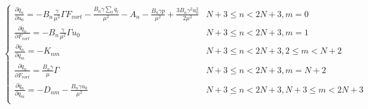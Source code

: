 \documentclass[superscriptaddress, onecolumn, prl]{revtex4}
\begin{document}
\begin{equation}
\begin{cases}
\frac{\partial \ddot{q}_n}{\partial u_0} =-B_n  \frac{\gamma }{\mu^2} \Gamma F_{vort} -\frac{B_n \gamma \sum_l \dot{q}_l}{\mu^2} - A_n - \frac{B_n \gamma p }{\mu^2} + \frac{3 B_n \gamma^2 u_0^2}{2 \mu^2}  & N+3 \leq n < 2N+3, m=0\\
\frac{\partial \ddot{q}_n}{\partial F_{vort}} = -B_n  \frac{\gamma }{\mu^2} \Gamma u_0 & N+3 \leq n < 2N+3, m=1\\
\frac{\partial \ddot{q}_n}{\partial q_m} = -K_{nm} & N+3 \leq n < 2N+3, 2 \leq m < N+2 \\
\frac{\partial \ddot{q}_n}{\partial \dot{F}_{vort}} = \frac{B_n \gamma}{\mu} \Gamma  & N+3 \leq n < 2N+3, m=N+2\\
\frac{\partial \ddot{q}_n}{\partial \dot{q}_m} = -D_{nm} - \frac{B_n \gamma u_0}{\mu^2} & N+3 \leq n < 2N + 3, N+3 \leq m < 2N+3 \\
\end{cases}
\end{equation}
\end{document}
